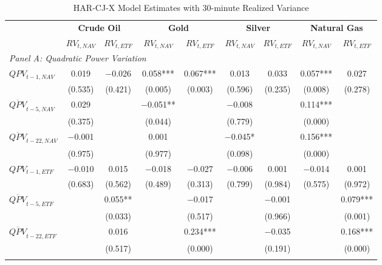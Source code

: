 \begin{landscape}
\begin{table}[htbp]
\centering
\caption{HAR-CJ-X Model Estimates with 30-minute Realized Variance}
\label{tab:HAR_CJ_30min}
\begin{threeparttable}
\footnotesize
\begin{tabular}{@{}lcccccccc@{}}
\toprule
 & \multicolumn{2}{c}{\textbf{Crude Oil}} & \multicolumn{2}{c}{\textbf{Gold}} & \multicolumn{2}{c}{\textbf{Silver}} & \multicolumn{2}{c}{\textbf{Natural Gas}} \\
\cmidrule(lr){2-3} \cmidrule(lr){4-5} \cmidrule(lr){6-7} \cmidrule(lr){8-9}
 & $RV_{t,NAV}$ & $RV_{t,ETF}$ & $RV_{t,NAV}$ & $RV_{t,ETF}$ & $RV_{t,NAV}$ & $RV_{t,ETF}$ & $RV_{t,NAV}$ & $RV_{t,ETF}$ \\
\midrule
\multicolumn{9}{l}{\textit{Panel A: Quadratic Power Variation}} \\
\addlinespace[0.1cm]
$QPV_{t-1,NAV}$ & 0.019 & $-$0.026 & 0.058*** & 0.067*** & 0.013 & 0.033 & 0.057*** & 0.027 \\
                & (0.535) & (0.421) & (0.005) & (0.003) & (0.596) & (0.235) & (0.008) & (0.278) \\
\addlinespace[0.05cm]
$\overline{QPV}_{t-5,NAV}$ & 0.029 &  & $-$0.051** &  & $-$0.008 &  & 0.114*** &  \\
                          & (0.375) &  & (0.044) &  & (0.779) &  & (0.000) &  \\
\addlinespace[0.05cm]
$\overline{QPV}_{t-22,NAV}$ & $-$0.001 &  & 0.001 &  & $-$0.045* &  & 0.156*** &  \\
                           & (0.975) &  & (0.977) &  & (0.098) &  & (0.000) &  \\
\addlinespace[0.05cm]
$QPV_{t-1,ETF}$ & $-$0.010 & 0.015 & $-$0.018 & $-$0.027 & $-$0.006 & 0.001 & $-$0.014 & 0.001 \\
                & (0.683) & (0.562) & (0.489) & (0.313) & (0.799) & (0.984) & (0.575) & (0.972) \\
\addlinespace[0.05cm]
$\overline{QPV}_{t-5,ETF}$ &  & 0.055** &  & $-$0.017 &  & $-$0.001 &  & 0.079*** \\
                          &  & (0.033) &  & (0.517) &  & (0.966) &  & (0.001) \\
\addlinespace[0.05cm]
$\overline{QPV}_{t-22,ETF}$ &  & 0.016 &  & 0.234*** &  & $-$0.035 &  & 0.168*** \\
                           &  & (0.517) &  & (0.000) &  & (0.191) &  & (0.000) \\
\addlinespace[0.2cm]


\end{tabular}
\end{threeparttable}
\end{table}
\end{landscape}
